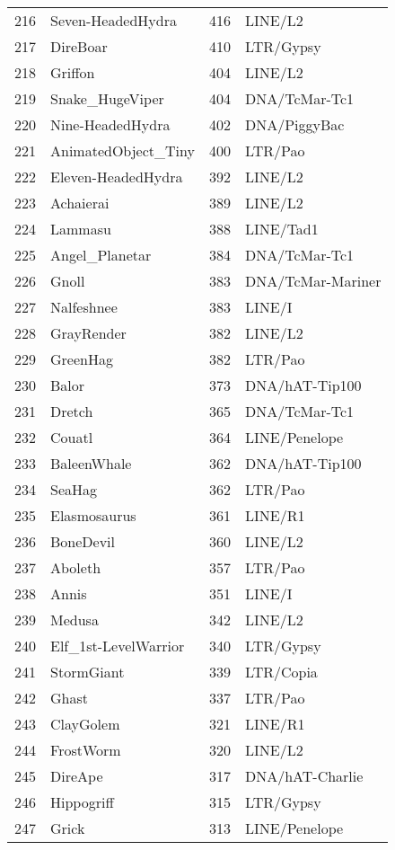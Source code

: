\begin{table}[ht]
\begin{tabular}{rlrl}
  216 & Seven-HeadedHydra & 416 & LINE/L2  \\ 
  217 & DireBoar & 410 & LTR/Gypsy  \\ 
  218 & Griffon & 404 & LINE/L2  \\ 
  219 & Snake\_HugeViper & 404 & DNA/TcMar-Tc1  \\ 
  220 & Nine-HeadedHydra & 402 & DNA/PiggyBac  \\ 
  221 & AnimatedObject\_Tiny & 400 & LTR/Pao  \\ 
  222 & Eleven-HeadedHydra & 392 & LINE/L2  \\ 
  223 & Achaierai & 389 & LINE/L2  \\ 
  224 & Lammasu & 388 & LINE/Tad1  \\ 
  225 & Angel\_Planetar & 384 & DNA/TcMar-Tc1  \\ 
  226 & Gnoll & 383 & DNA/TcMar-Mariner  \\ 
  227 & Nalfeshnee & 383 & LINE/I  \\ 
  228 & GrayRender & 382 & LINE/L2  \\ 
  229 & GreenHag & 382 & LTR/Pao  \\ 
  230 & Balor & 373 & DNA/hAT-Tip100  \\ 
  231 & Dretch & 365 & DNA/TcMar-Tc1  \\ 
  232 & Couatl & 364 & LINE/Penelope  \\ 
  233 & BaleenWhale & 362 & DNA/hAT-Tip100  \\ 
  234 & SeaHag & 362 & LTR/Pao  \\ 
  235 & Elasmosaurus & 361 & LINE/R1  \\ 
  236 & BoneDevil & 360 & LINE/L2  \\ 
  237 & Aboleth & 357 & LTR/Pao  \\ 
  238 & Annis & 351 & LINE/I  \\ 
  239 & Medusa & 342 & LINE/L2  \\ 
  240 & Elf\_1st-LevelWarrior & 340 & LTR/Gypsy  \\ 
  241 & StormGiant & 339 & LTR/Copia  \\ 
  242 & Ghast & 337 & LTR/Pao  \\ 
  243 & ClayGolem & 321 & LINE/R1  \\ 
  244 & FrostWorm & 320 & LINE/L2  \\ 
  245 & DireApe & 317 & DNA/hAT-Charlie  \\ 
  246 & Hippogriff & 315 & LTR/Gypsy  \\ 
  247 & Grick & 313 & LINE/Penelope  \\ 

\end{tabular}
\end{table}
